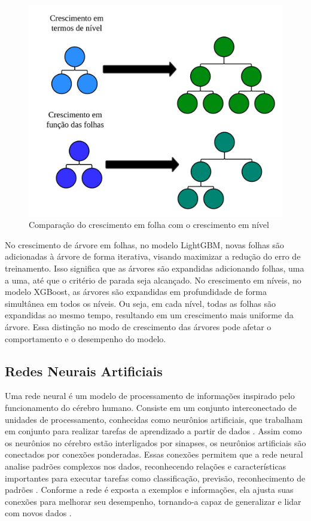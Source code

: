  \begin{figure}[!htb]
 	\centering
 	\caption{Comparação do crescimento em folha com o crescimento em nível}
 	\label{fig:xgboost}
 	\includegraphics[width=0.7\linewidth]{Modelos/Figuras/xgboost.pdf}
 \end{figure}
 
 
 No crescimento de árvore em folhas, no modelo LightGBM, novas folhas são adicionadas à árvore de forma iterativa, visando maximizar a redução do erro de treinamento. Isso significa que as árvores são expandidas adicionando folhas, uma a uma, até que o critério de parada seja alcançado.  No crescimento em níveis, no modelo XGBoost, as árvores são expandidas em profundidade de forma simultânea em todos os níveis. Ou seja, em cada nível, todas as folhas são expandidas ao mesmo tempo, resultando em um crescimento mais uniforme da árvore. Essa distinção no modo de crescimento das árvores pode afetar o comportamento e o desempenho do modelo. 
  
 \subsection{Redes Neurais Artificiais}
 
 Uma rede neural é um modelo de processamento de informações inspirado pelo funcionamento do cérebro humano. Consiste em um conjunto interconectado de unidades de processamento, conhecidas como neurônios artificiais, que trabalham em conjunto para realizar tarefas de aprendizado a partir de dados \cite{XIANG2018874}. Assim como os neurônios no cérebro estão interligados por sinapses, os neurônios artificiais são conectados por conexões ponderadas. Essas conexões permitem que a rede neural analise padrões complexos nos dados, reconhecendo relações e características importantes para executar tarefas como classificação, previsão, reconhecimento de padrões \cite{BABU201427}. Conforme a rede é exposta a exemplos e informações, ela ajusta suas conexões para melhorar seu desempenho, tornando-a capaz de generalizar e lidar com novos dados \cite{RAO2020107851}.

